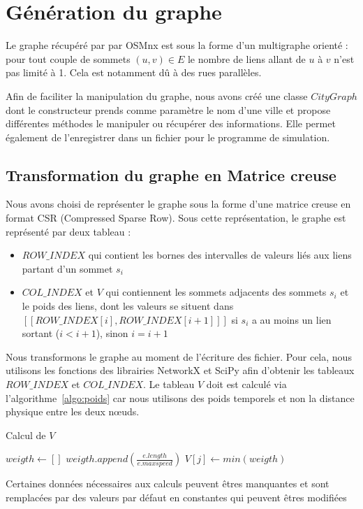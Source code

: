 \section{Génération du graphe}\label{sec:graphe}
	Le graphe récupéré par par OSMnx est sous la forme d'un multigraphe orienté : pour tout couple de sommets $(u,v)\in E$ le nombre de liens allant de $u$ à $v$ n'est pas limité à 1. Cela est notamment dû à des rues parallèles.
	
	Afin de faciliter la manipulation du graphe, nous avons créé une classe $CityGraph$ dont le constructeur prends comme paramètre le nom d'une ville et propose différentes méthodes le manipuler ou récupérer des informations. Elle permet également de l'enregistrer dans un fichier pour le programme de simulation.

\subsection{Transformation du graphe en Matrice creuse}
	Nous avons choisi de représenter le graphe sous la forme d'une matrice creuse en format CSR (Compressed Sparse Row). Sous cette représentation, le graphe est représenté par deux tableau : 
	\begin{itemize}
		\item $ROW\_INDEX$ qui contient les bornes des intervalles de valeurs liés aux liens partant d'un sommet $s_i$ %
		\item $COL\_INDEX$ et $V$ qui contiennent les sommets adjacents des sommets $s_i$ et le poids des liens, dont les valeurs se situent dans \\$[\![ROW\_INDEX[i],ROW\_INDEX[i+1]]\!]$ si $s_i$ a au moins un lien sortant ($i<i+1$), sinon $i=i+1$
	\end{itemize}
	Nous transformons le graphe au moment de l'écriture des fichier. Pour cela, nous utilisons les fonctions des librairies NetworkX et SciPy %
	afin d'obtenir les tableaux $ROW\_INDEX$ et $COL\_INDEX$. Le tableau $V$ doit est calculé via l'algorithme~\ref{algo:poids} car nous utilisons des poids temporels et non la distance physique entre les deux nœuds. 
\begin{algorithm}
\caption{Calcul de $V$}\label{algo:poids}
\begin{algorithmic}
			\State $weigth \gets []$
				\State $weigth.append\left(\frac{e.length}{e.maxspeed}\right)$
			\EndFor
			\State $V[j]\gets min(weigth)$
		\EndFor
	\EndFor
\end{algorithmic}
\end{algorithm}

Certaines données nécessaires aux calculs peuvent êtres manquantes et sont remplacées par des valeurs par défaut en constantes qui peuvent êtres modifiées